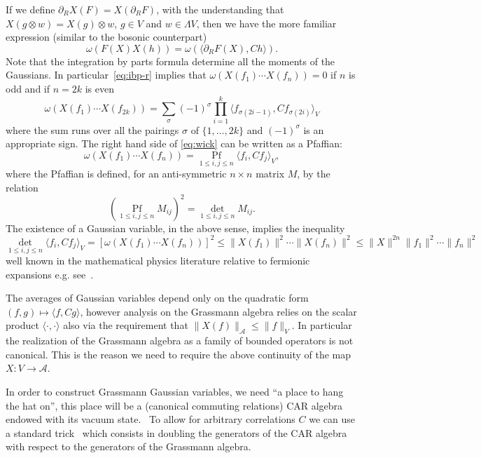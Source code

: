 \documentclass{article}
\newcommand{\tmop}[1]{\ensuremath{\operatorname{#1}}}
\begin{document}
If we define $\partial_R X (F) = X (\partial_R F)$, with the understanding
that $X (g \otimes w) = X (g) \otimes w$, $g \in V$ and $w \in \Lambda V$,
then we have the more familiar expression (similar to the bosonic counterpart)
\[ \omega (F (X) X (h)) = \omega (\langle \partial_R F (X), C h \rangle) . \]
Note that the integration by parts formula determine all the moments of the
Gaussians. In particular~{\eqref{eq:ibp-r}} implies that $\omega (X (f_1)
\cdots X (f_n)) = 0$ if $n$ is odd and if $n = 2 k$ is even
\begin{equation}
  \omega (X (f_1) \cdots X (f_{2 k})) = \sum_{\sigma} (- 1)^{\sigma} \prod_{i
  = 1}^k \langle f_{\sigma (2 i - 1)}, C f_{\sigma (2 i)} \rangle_V
  \label{eq:wick}
\end{equation}
where the sum runs over all the pairings $\sigma$ of $\{ 1, \ldots, 2 k \}$
and $(- 1)^{\sigma}$ is an appropriate sign. The right hand side of
{\eqref{eq:wick}} can be written as a Pfaffian:
\[ \omega (X (f_1) \cdots X (f_n)) = \underset{1 \leqslant i, j \leqslant
   n}{\tmop{Pf}} \langle f_i, C f_j \rangle_V, \]
where the Pfaffian is defined, for an anti-symmetric $n \times n$ matrix $M$,
by the relation
\[ (\underset{1 \leqslant i, j \leqslant n}{\tmop{Pf}} M_{i j})^2 =
   \underset{1 \leqslant i, j \leqslant n}{\det} M_{i j} . \]
The existence of a Gaussian variable, in the above sense, implies the
inequality
\[ \underset{1 \leqslant i, j \leqslant n}{\det} \langle f_i, C f_j \rangle_V
   = [\omega (X (f_1) \cdots X (f_n))]^2 \leqslant \| X (f_1) \|^2 \cdots \| X
   (f_n) \|^2 \leqslant \| X \|^{2 n} \| f_1 \|^2 \cdots \| f_n \|^2 \]
well known in the mathematical physics literature relative to fermionic
expansions e.g. see~{\cite{mastropietro_non-perturbative_2008}}.

\begin{remark}
  The averages of Gaussian variables depend only on the quadratic form $(f, g)
  \mapsto \langle f, C g \rangle$, however analysis on the Grassmann algebra
  relies on the scalar product $\langle \cdot, \cdot \rangle$ also via the
  requirement that $\| X (f) \|_{\mathcal{A}} \leqslant \| f \|_V$. In
  particular the realization of the Grassmann algebra as a family of bounded
  operators is not canonical. This is the reason we need to require the above
  continuity of the map $X : V \rightarrow \mathcal{A}$.
\end{remark}

In order to construct Grassmann Gaussian variables, we need ``a place to hang
the hat on'', this place will be a (canonical commuting relations) CAR algebra
endowed with its vacuum state. \ To allow for arbitrary correlations $C$ we
can use a standard trick~{\cite{osterwalder_euclidean_1973-2}} which consists
in doubling the generators of the CAR algebra with respect to the generators
of the Grassmann algebra.
\end{document}
